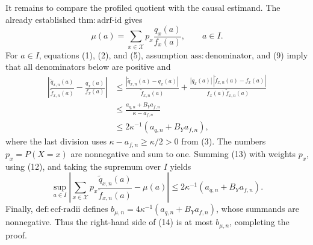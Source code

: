 It remains to compare the profiled quotient with the causal estimand.  The already established \(\mathrm{thm{:}adrf\text{-}id}\) gives
\[
 \mu(a)=\sum_{x\in\mathcal X}p_x\frac{q_x(a)}{f_x(a)},
 \qquad a\in I.                                                   \tag{12}
\]
For \(a\in I\), equations (1), (2), and (5), assumption \(\mathrm{ass{:}denominator}\), and (9) imply that all denominators below are positive and
\[
 \begin{aligned}
 \left|\frac{\widetilde q_{x,n}(a)}{\widetilde f_{x,n}(a)}
       -\frac{q_x(a)}{f_x(a)}\right|
 &\le
 \frac{|\widetilde q_{x,n}(a)-q_x(a)|}{\widetilde f_{x,n}(a)}
 +\frac{|q_x(a)|\,|\widetilde f_{x,n}(a)-f_x(a)|}
 {f_x(a)\widetilde f_{x,n}(a)}\\
 &\le\frac{a_{q,n}+B_Ya_{f,n}}{\kappa-a_{f,n}}\\
 &\le2\kappa^{-1}(a_{q,n}+B_Ya_{f,n}),                            \tag{13}
 \end{aligned}
\]
where the last division uses \(\kappa-a_{f,n}\ge\kappa/2>0\) from (3).
The numbers \(p_x=P(X=x)\) are nonnegative and sum to one.  Summing (13) with weights \(p_x\), using (12), and taking the supremum over \(I\) yields
\[
 \sup_{a\in I}\left|
 \sum_{x\in\mathcal X}p_x
 \frac{\widetilde q_{x,n}(a)}{\widetilde f_{x,n}(a)}-\mu(a)
 \right|
 \le2\kappa^{-1}(a_{q,n}+B_Ya_{f,n}).                             \tag{14}
\]
Finally, \(\mathrm{def{:}ecf\text{-}radii}\) defines
\(b_{\mu,n}=4\kappa^{-1}(a_{q,n}+B_Ya_{f,n})\), whose summands are nonnegative.  Thus the right-hand side of (14) is at most \(b_{\mu,n}\), completing the proof.
